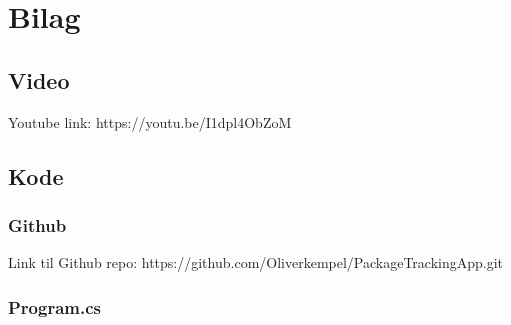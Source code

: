 \chapter{Bilag}
\section{Video}
Youtube link:
https://youtu.be/I1dpl4ObZoM
\section{Kode}
\subsection{Github}
Link til Github repo:
https://github.com/Oliverkempel/PackageTrackingApp.git
\subsection{Program.cs}

